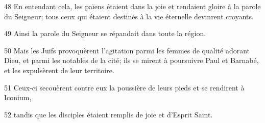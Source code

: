
48 En entendant cela, les païens étaient dans la joie et rendaient gloire à la parole du Seigneur; tous ceux qui étaient destinés à la vie éternelle devinrent croyants.

49 Ainsi la parole du Seigneur se répandait dans toute la région.

50 Mais les Juifs provoquèrent l’agitation parmi les femmes de qualité adorant Dieu, et parmi les notables de la cité; ils se mirent à poursuivre Paul et Barnabé, et les expulsèrent de leur territoire.

51 Ceux-ci secouèrent contre eux la poussière de leurs pieds et se rendirent à Iconium,

52 tandis que les disciples étaient remplis de joie et d’Esprit Saint.